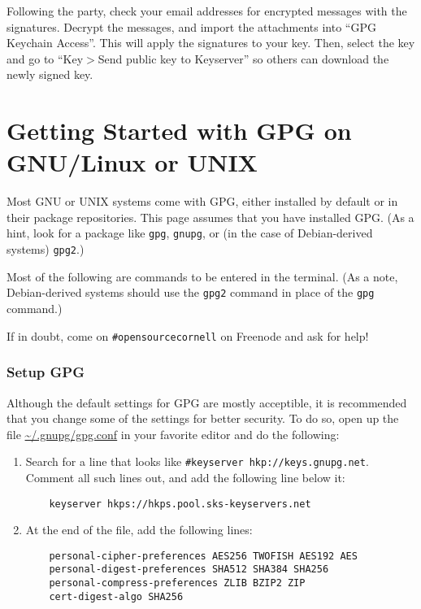 \documentclass{article}
\begin{document}
Following the party, check your email addresses for encrypted messages
with the signatures.  Decrypt the messages, and import the attachments
into ``GPG Keychain Access''.  This will apply the signatures to your
key.  Then, select the key and go to ``Key$>$Send public key to
Keyserver'' so others can download the newly signed key.

\newpage
\part*{Getting Started with GPG on GNU/Linux or UNIX}
Most GNU or UNIX systems come with GPG, either installed by default or
in their package repositories.  This page assumes that you have
installed GPG.  (As a hint, look for a package like \texttt{gpg},
\texttt{gnupg}, or (in the case of Debian-derived systems)
\texttt{gpg2}.)

Most of the following are commands to be entered in the terminal.  (As
a note, Debian-derived systems should use the \texttt{gpg2} command in
place of the \texttt{gpg} command.)

If in doubt, come on \texttt{\#opensourcecornell} on Freenode and ask
for help!

\section*{Setup GPG}
Although the default settings for GPG are mostly acceptible, it is
recommended that you change some of the settings for better security.
To do so, open up the file \url{~/.gnupg/gpg.conf} in your favorite
editor and do the following:

\begin{enumerate}
\item Search for a line that looks like \texttt{\#keyserver
    hkp://keys.gnupg.net}.  Comment all such lines out, and add the
  following line below it:

  \begin{lstlisting}
    keyserver hkps://hkps.pool.sks-keyservers.net
  \end{lstlisting}
\item At the end of the file, add the following lines:

  \begin{lstlisting}
    personal-cipher-preferences AES256 TWOFISH AES192 AES
    personal-digest-preferences SHA512 SHA384 SHA256
    personal-compress-preferences ZLIB BZIP2 ZIP
    cert-digest-algo SHA256
  \end{lstlisting}
\end{enumerate}
\end{document}
